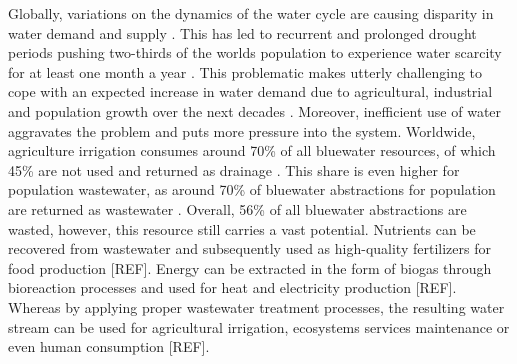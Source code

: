 

Globally, variations on the dynamics of the water cycle are causing disparity in water demand and supply \cite{FAO2015,unescoWastewaterUntappedResource2017}. This has led to recurrent and prolonged drought periods pushing two-thirds of the worlds population to experience water scarcity for at least one month a year \cite{Mekonnene1500323}. This problematic makes utterly challenging to cope with an expected increase in water demand due to agricultural, industrial and population growth over the next decades \cite{IFPRI2017}. Moreover, inefficient use of water aggravates the problem and puts more pressure into the system. Worldwide, agriculture irrigation consumes around 70\% of all bluewater resources, of which 45\% are not used and returned as drainage \cite{unescoWastewaterUntappedResource2017}. This share is even higher for population wastewater, as around 70\% of bluewater abstractions for population are returned as wastewater \cite{unescoWastewaterUntappedResource2017}. Overall, 56\% of all bluewater abstractions are wasted, however, this resource still carries a vast potential. Nutrients can be recovered from wastewater and subsequently used as high-quality fertilizers for food production [REF]. Energy can be extracted in the form of biogas through bioreaction processes and used for heat and electricity production [REF]. Whereas by applying proper wastewater treatment processes, the resulting water stream can be used for agricultural irrigation, ecosystems services maintenance or even human consumption [REF].

